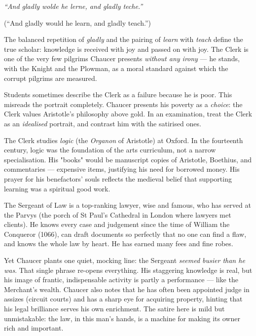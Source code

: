 \documentclass[11pt]{article}
\newcommand{\cle}[1]{{\popxbold\color{popdark}#1}}
\newcounter{popsec}
\newcounter{popsub}
\newcommand{\courssub}[1]{%
  \stepcounter{popsub}%
  \par\vspace{9pt}\noindent{\popxbold\fontsize{11.5}{13}\selectfont\color{popink}{\color{poporange}\thepopsec.\thepopsub}\hspace{6pt}#1}\par\nopagebreak\vspace{4pt}
}
\begin{document}
\begin{aretenir}
\emph{``And gladly wolde he lerne, and gladly teche.''}\par
(``And gladly would he learn, and gladly teach.'')\par
The balanced repetition of \emph{gladly} and the pairing of \emph{learn} with \emph{teach} define the true scholar: knowledge is received with joy and passed on with joy. The Clerk is one of the very few pilgrims Chaucer presents \emph{without any irony} — he stands, with the Knight and the Plowman, as a moral standard against which the corrupt pilgrims are measured.
\end{aretenir}

\begin{attention}
Students sometimes describe the Clerk as a failure because he is poor. This misreads the portrait completely. Chaucer presents his poverty as a \emph{choice}: the Clerk values Aristotle's philosophy above gold. In an examination, treat the Clerk as an \emph{idealised} portrait, and contrast him with the satirised ones.
\end{attention}

\begin{savaistu}
The Clerk studies \emph{logic} (the \emph{Organon} of Aristotle) at Oxford. In the fourteenth century, logic was the foundation of the arts curriculum, not a narrow specialisation. His "books" would be manuscript copies of Aristotle, Boethius, and commentaries — expensive items, justifying his need for borrowed money. His prayer for his benefactors' souls reflects the medieval belief that supporting learning was a spiritual good work.
\end{savaistu}

\courssub{The Sergeant of Law: Busier Than He Is}

The \cle{Sergeant of Law} is a top-ranking lawyer, wise and famous, who has served at the \cle{Parvys} (the porch of St Paul's Cathedral in London where lawyers met clients). He knows every case and judgement since the time of William the Conqueror (1066), can draft documents so perfectly that no one can find a flaw, and knows the whole law by heart. He has earned many fees and fine robes.

Yet Chaucer plants one quiet, mocking line: the Sergeant \emph{seemed busier than he was}. That single phrase re-opens everything. His staggering knowledge is real, but his image of frantic, indispensable activity is partly a performance — like the Merchant's wealth. Chaucer also notes that he has often been appointed judge in assizes (circuit courts) and has a sharp eye for acquiring property, hinting that his legal brilliance serves his own enrichment. The satire here is mild but unmistakable: the law, in this man's hands, is a machine for making its owner rich and important.
\end{document}
